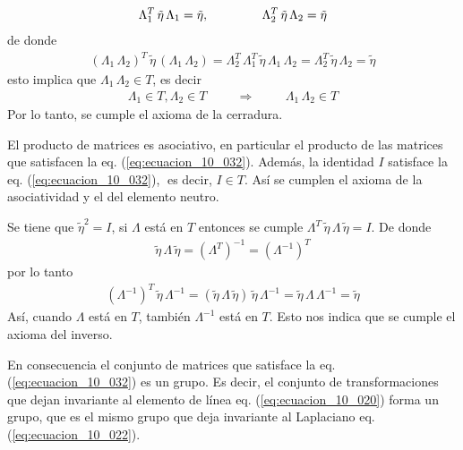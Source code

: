 \begin{align}
\Lambda_{1}^{T} \, \tilde{\eta} \, \Lambda_{1} = \tilde{\eta}, \hspace{1.5cm} \Lambda_{2}^{T} \, \tilde{\eta} \, \Lambda_{2} = \tilde{\eta}
\label{eq:ecuacion_10_033}
\end{align}
de donde
\begin{align}
(\Lambda_{1} \, \Lambda_{2})^{T} \, \tilde{\eta} \, (\Lambda_{1} \, \Lambda_{2}) =\Lambda_{2}^{T} \, \Lambda_{1}^{T} \, \tilde{\eta} \, \Lambda_{1} \, \Lambda_{2} = \Lambda_{2}^{T} \, \tilde{\eta} \, \Lambda_{2} = \tilde{\eta}
\label{eq:ecuacion_10_034}
\end{align}
esto implica que $\Lambda_{1} \, \Lambda_{2} \in T$, es decir
\begin{align}
\Lambda_{1} \in T, \Lambda_{2} \in T \hspace{1cm} \Rightarrow \hspace{1cm} \Lambda_{1} \, \Lambda_{2} \in T
\label{eq:ecuacion_10_035}
\end{align}
Por lo tanto, se cumple el axioma de la cerradura.
\par
El producto de matrices es asociativo, en particular el producto de las matrices que satisfacen la eq. (\ref{eq:ecuacion_10_032}). Además, la identidad $I$ satisface la eq. (\ref{eq:ecuacion_10_032}), es decir, $I \in T$. Así se cumplen el axioma de la asociatividad y el del elemento
neutro.
\par
Se tiene que $\tilde{\eta}^{2} = I$, si $\Lambda$ está en $T$ entonces se cumple $\Lambda^{T} \, \tilde{\eta} \, \Lambda \, \tilde{\eta} = I$. De donde
\begin{align}
\tilde{\eta} \, \Lambda \, \tilde{\eta} = \left( \Lambda^{T} \right)^{-1} = \left( \Lambda^{-1} \right)^{T}
\label{eq:ecuacion_10_036}
\end{align}
por lo tanto
\begin{align}
\left( \Lambda^{-1} \right)^{T}\, \tilde{\eta} \, \Lambda^{-1} = ( \tilde{\eta} \, \Lambda \, \tilde{\eta} ) \, \tilde{\eta} \, \Lambda^{-1} = \tilde{\eta} \, \Lambda \, \Lambda^{-1} = \tilde{\eta}
\label{eq:ecuacion_10_037}
\end{align}
Así, cuando $\Lambda$ está en $T$, también $\Lambda^{-1}$ está en $T$. Esto nos indica que se cumple el axioma del inverso.
\par
En consecuencia el conjunto de matrices que satisface la eq. (\ref{eq:ecuacion_10_032}) es un grupo. Es decir, el conjunto de transformaciones que dejan invariante al elemento de línea eq. (\ref{eq:ecuacion_10_020}) forma un grupo, que es el mismo grupo que deja invariante al Laplaciano eq. (\ref{eq:ecuacion_10_022}).
